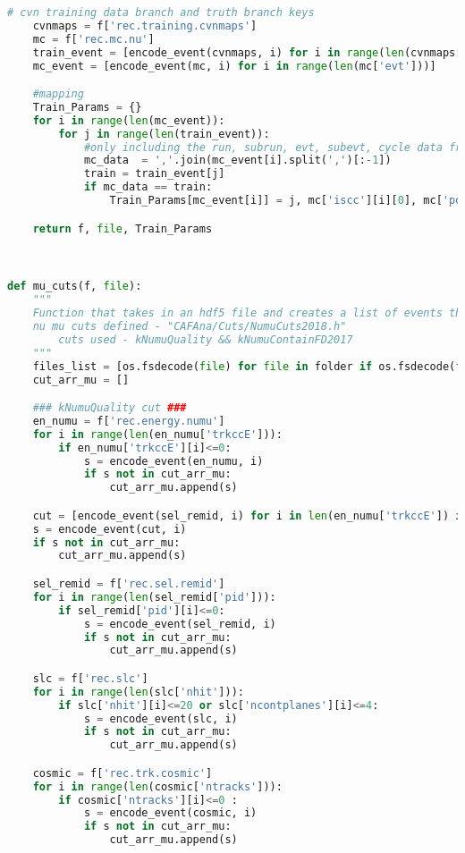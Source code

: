 \begin{lstlisting}[language=Python]
    # cvn training data branch and truth branch keys
    cvnmaps = f['rec.training.cvnmaps']
    mc = f['rec.mc.nu']
    train_event = [encode_event(cvnmaps, i) for i in range(len(cvnmaps['evt']))]
    mc_event = [encode_event(mc, i) for i in range(len(mc['evt']))]

    #mapping
    Train_Params = {}
    for i in range(len(mc_event)):
        for j in range(len(train_event)):
            #only including the run, subrun, evt, subevt, cycle data from the mc branch in the matching
            mc_data  = ','.join(mc_event[i].split(',')[:-1])
            train = train_event[j]
            if mc_data == train:
                Train_Params[mc_event[i]] = j, mc['iscc'][i][0], mc['pdg'][i][0]

    return f, file, Train_Params



def mu_cuts(f, file):
    """
    Function that takes in an hdf5 file and creates a list of events that do not pass the nu mu cuts:
    nu mu cuts defined - "CAFAna/Cuts/NumuCuts2018.h"
        cuts used - kNumuQuality && kNumuContainFD2017
    """
    files_list = [os.fsdecode(file) for file in folder if os.fsdecode(file).endswith(('.h5'))]
    cut_arr_mu = []

    ### kNumuQuality cut ###
    en_numu = f['rec.energy.numu']
    for i in range(len(en_numu['trkccE'])):
        if en_numu['trkccE'][i]<=0:
            s = encode_event(en_numu, i)
            if s not in cut_arr_mu:
                cut_arr_mu.append(s)

    cut = [encode_event(sel_remid, i) for i in len(en_numu['trkccE']) if en_numu['trkccE'][i]<=0]
    s = encode_event(cut, i)
    if s not in cut_arr_mu:
        cut_arr_mu.append(s)

    sel_remid = f['rec.sel.remid']
    for i in range(len(sel_remid['pid'])):
        if sel_remid['pid'][i]<=0:
            s = encode_event(sel_remid, i)
            if s not in cut_arr_mu:
                cut_arr_mu.append(s)

    slc = f['rec.slc']
    for i in range(len(slc['nhit'])):
        if slc['nhit'][i]<=20 or slc['ncontplanes'][i]<=4:
            s = encode_event(slc, i)
            if s not in cut_arr_mu:
                cut_arr_mu.append(s)

    cosmic = f['rec.trk.cosmic']
    for i in range(len(cosmic['ntracks'])):
        if cosmic['ntracks'][i]<=0 :
            s = encode_event(cosmic, i)
            if s not in cut_arr_mu:
                cut_arr_mu.append(s)


\end{lstlisting}
